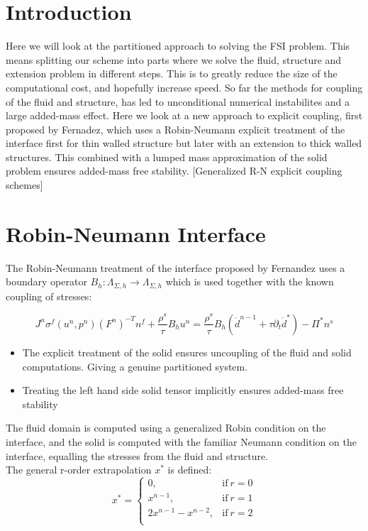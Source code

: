 


\section*{Introduction}
Here we will look at the partitioned approach to solving the FSI problem. This means splitting our scheme into parts where we solve the fluid, structure and extension problem in different steps. This is to greatly reduce the size of the computational cost, and hopefully increase speed. So far the methods for coupling of the fluid and structure, has led to unconditional numerical instabilites and a large added-mass effect. Here we look at a new approach to explicit coupling, first proposed by Fernadez, which uses a Robin-Neumann explicit treatment of the interface first for thin walled structure \cite{Fernandez2013} but later with an extension to thick walled structures\cite{Fernandez2015}. This combined with a lumped mass approximation of the solid problem ensures added-mass free stability. [Generalized R-N explicit coupling schemes]

\section*{Robin-Neumann Interface}
The Robin-Neumann treatment of the interface proposed by Fernandez uses a boundary operator $ B_h : \Lambda_{\Sigma, h} \rightarrow \Lambda_{\Sigma, h}  $ which is used together with the known coupling of stresses:

$$  J^n \sigma^f(u^n, p^n)(F^n)^{-T}n^f + \frac{\rho^s}{\tau} B_h u^n = \frac{\rho^s}{\tau} B_h (\dot{d}^{n-1} + \tau \partial_t \dot{d}^*  ) - \Pi^{*} n^s $$
\begin{itemize}  
\item The explicit treatment of the solid ensures uncoupling of the fluid and solid computations. Giving a genuine partitioned system. 
\item Treating the left hand side solid tensor implicitly ensures added-mass free stability
\end{itemize}
The fluid domain is computed using a generalized Robin condition on the interface, and the solid is computed with the familiar Neumann condition on the interface, equalling the stresses from the fluid and structure.\\
The general r-order extrapolation $x^*$ is defined: 
\begin{equation}
    x^*=
    \begin{cases}
      0, & \text{if}\ r=0 \\
      x^{n-1}, & \text{if}\ r =1 \\
      2x^{n-1} - x^{n-2}, & \text{if}\ r =2 \\
    \end{cases}
\end{equation}


